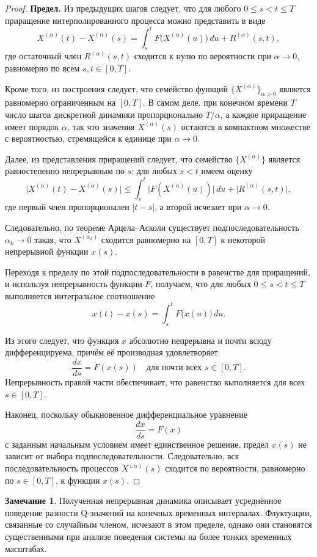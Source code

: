 \documentclass[12pt,a4paper]{article}
\theoremstyle{definition}
\newtheorem{remark}{Замечание}
\begin{document}
\begin{proof}
\medskip
\noindent
\textbf{Предел.}
Из предыдущих шагов следует, что для любого $0\le s<t\le T$
приращение интерполированного процесса можно представить в виде
\[
X^{(\alpha)}(t)-X^{(\alpha)}(s)
=
\int_s^t F\bigl(X^{(\alpha)}(u)\bigr)\,du
+
R^{(\alpha)}(s,t),
\]
где остаточный член $R^{(\alpha)}(s,t)$ сходится к нулю по вероятности
при $\alpha\to0$, равномерно по всем $s,t\in[0,T]$.

Кроме того, из построения следует, что семейство функций
$\{X^{(\alpha)}\}_{\alpha>0}$
является равномерно ограниченным на $[0,T]$.
В самом деле, при конечном времени $T$
число шагов дискретной динамики пропорционально $T/\alpha$,
а каждое приращение имеет порядок $\alpha$,
так что значения $X^{(\alpha)}(s)$ остаются в компактном множестве
с вероятностью, стремящейся к единице при $\alpha\to0$.

Далее, из представления приращений следует,
что семейство $\{X^{(\alpha)}\}$
является равностепенно непрерывным по $s$:
для любых $s<t$ имеем оценку
\[
\bigl|X^{(\alpha)}(t)-X^{(\alpha)}(s)\bigr|
\le
\int_s^t \bigl|F(X^{(\alpha)}(u))\bigr|\,du
+
\bigl|R^{(\alpha)}(s,t)\bigr|,
\]
где первый член пропорционален $|t-s|$,
а второй исчезает при $\alpha\to0$.

Следовательно, по теореме Арцела–Асколи
существует подпоследовательность $\alpha_k\to0$
такая, что $X^{(\alpha_k)}$
сходится равномерно на $[0,T]$
к некоторой непрерывной функции $x(s)$.

Переходя к пределу по этой подпоследовательности
в равенстве для приращений,
и используя непрерывность функции $F$,
получаем, что для любых $0\le s<t\le T$ выполняется
интегральное соотношение
\[
x(t)-x(s)
=
\int_s^t F\bigl(x(u)\bigr)\,du.
\]

Из этого следует, что функция $x$ абсолютно непрерывна
и почти всюду дифференцируема,
причём её производная удовлетворяет
\[
\frac{dx}{ds}=F(x(s))
\quad\text{для почти всех } s\in[0,T].
\]
Непрерывность правой части обеспечивает,
что равенство выполняется для всех $s\in[0,T]$.

Наконец, поскольку обыкновенное дифференциальное уравнение
\[
\frac{dx}{ds}=F(x)
\]
с заданным начальным условием
имеет единственное решение,
предел $x(s)$ не зависит от выбора подпоследовательности.
Следовательно, вся последовательность процессов
$X^{(\alpha)}(s)$
сходится по вероятности,
равномерно по $s\in[0,T]$,
к функции $x(s)$.
\end{proof}


\begin{remark}
Полученная непрерывная динамика описывает усреднённое поведение
разности Q-значений на конечных временных интервалах.
Флуктуации, связанные со случайным членом,
исчезают в этом пределе,
однако они становятся существенными
при анализе поведения системы
на более тонких временных масштабах.
\end{remark}
\end{document}
